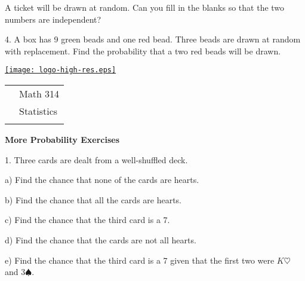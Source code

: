 \documentclass[10pt]{article}
\begin{document}
A ticket will be drawn at random.  Can you fill in the blanks so that 
the two numbers are independent?
\vspace{1in}

4. A box has 9 green beads and one red bead.  Three beads are drawn at random with replacement.
Find the probability that a two red beads will be drawn.

\vfill
\eject          


\pagestyle{empty}
\lstset{language=R, showspaces=false, showstringspaces=false}

\href{http://www.shepherd.edu}{\texttt{[image: logo-high-res.eps]}}
\vspace{-1.79cm}

{\small
\begin{tabular}{cl}
& Math 314\\
& Statistics\\
\hspace{5.28in} & \\
\end{tabular}
}
\setlength{\baselineskip}{1.05\baselineskip}

\begin{center}
\textbf{\large  More Probability Exercises}
\end{center}

1. Three cards are dealt from a well-shuffled deck.
\smallskip

\hspace{20pt} a) Find the chance that none of the cards are hearts.
\vspace{0.75in}

\hspace{20pt} b) Find the chance that all the cards are hearts.
\vspace{0.75in}

\hspace{20pt} c) Find the chance that the third card is a 7.
\vspace{0.75in}

\hspace{20pt} d) Find the chance that the cards are not all hearts.
\vspace{0.75in}

\hspace{20pt} e) Find the chance that the third card is a 7 given that the first two 
were $K\heartsuit$ and $3\spadesuit$.
\vspace{0.75in}
\end{document}
